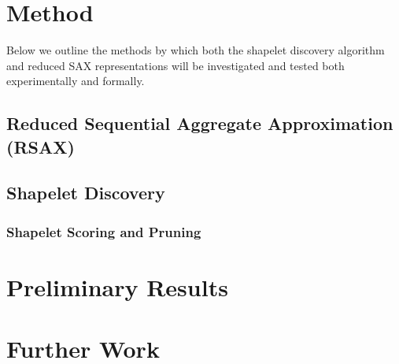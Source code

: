 \documentclass[10pt,a4paper]{article}
\begin{document}
\section{Method}

Below we outline the methods by which both the shapelet discovery algorithm and reduced SAX representations will be investigated and tested both experimentally and formally.

\subsection{Reduced Sequential Aggregate Approximation (RSAX)}

\subsection{Shapelet Discovery}

\subsubsection{Shapelet Scoring and Pruning}


\section{Preliminary  Results}

\section{Further Work} 
\end{document}
